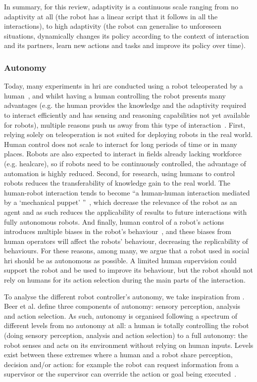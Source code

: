     In summary, for this review, adaptivity is a continuous scale ranging from no adaptivity at all (the robot has a linear script that it follows in all the interactions), to high adaptivity (the robot can generalise to unforeseen situations, dynamically changes its policy according to the context of interaction and its partners, learn new actions and tasks and improve its policy over time). 

\subsubsection{Autonomy}
	Today, many experiments in \gls{hri} are conducted using a robot teleoperated by a human~\citep{riek2012wizard,baxter2016characterising}, and whilst having a human controlling the robot presents many advantages (e.g. the human provides the knowledge and the adaptivity required to interact efficiently and has sensing and reasoning capabilities not yet available for robots), multiple reasons push us away from this type of interaction~\citep{thill2012robot}. First, relying solely on teleoperation is not suited for deploying robots in the real world. Human control does not scale to interact for long periods of time or in many places. Robots are also expected to interact in fields already lacking workforce (e.g. healcare), so if robots need to be continuously controlled, the advantage of automation is highly reduced. Second, for research, using humans to control robots reduces the transferability of knowledge gain to the real world. The human-robot interaction tends to become ``a human-human interaction mediated by a `mechanical puppet' ''~\citep{baxter2016characterising}, which decrease the relevance of the robot as an agent and as such reduces the applicability of results to future interactions with fully autonomous robots. And finally, human control of a robot's actions introduces multiple biases in the robot's behaviour~\citep{howley2014effects}, and these biases from human operators will affect the robots' behaviour, decreasing the replicability of behaviours. For these reasons, among many, we argue that a robot used in social \gls{hri} should be as autonomous as possible. A limited human supervision could support the robot and be used to improve its behaviour, but the robot should not rely on humans for its action selection during the main parts of the interaction. 
		
    To analyse the different robot controller's autonomy, we take inspiration from \citet{beer2014toward}. Beer et al. define three components of autonomy: sensory perception, analysis and action selection. As such, autonomy is organised following a spectrum of different levels from no autonomy at all: a human is totally controlling the robot (doing sensory perception, analysis and action selection) to a full autonomy: the robot senses and acts on its environment without relying on human inputs. Levels exist between these extremes where a human and a robot share perception, decision and/or action: for example the robot can request information from a supervisor or the supervisor can override the action or goal being executed~\citep{sheridan1978human}.
    
